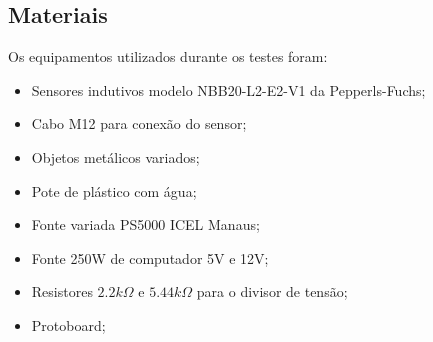 



\subsection{Materiais}
Os equipamentos utilizados durante os testes foram:
\begin{itemize}
  \item Sensores indutivos modelo NBB20-L2-E2-V1 da Pepperls-Fuchs;
  \item Cabo M12 para conexão do sensor;
  \item Objetos metálicos variados;
  \item Pote de plástico com água;
  \item Fonte variada PS5000 ICEL Manaus;
  \item Fonte 250W de computador 5V e 12V;
  \item Resistores $2.2k\Omega$ e $5.44k\Omega$ para o divisor de tensão;
  \item Protoboard;
\end{itemize}
\label{materials}





